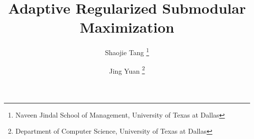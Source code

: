 \documentclass[twoside,leqno,twocolumn]{article}
\begin{document}

\title{\Large Adaptive Regularized Submodular Maximization}
\author{Shaojie Tang \thanks{Naveen Jindal School of Management, University of Texas at Dallas}
\and Jing Yuan \thanks{Department of Computer Science, University of Texas at Dallas}}

\date{}

\maketitle






\end{document}
